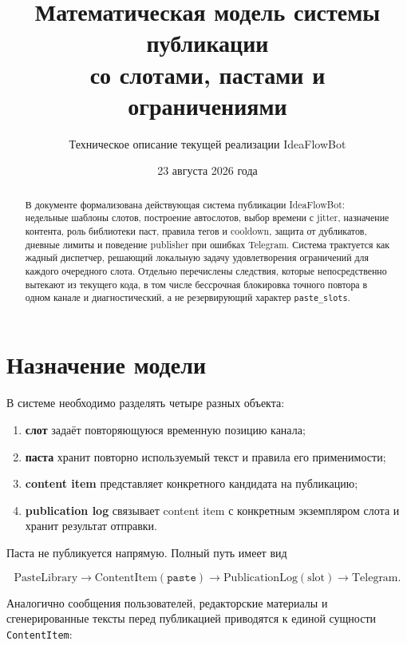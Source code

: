\documentclass[12pt,a4paper]{article}
\title{\textbf{Математическая модель системы публикации\\со слотами, пастами и ограничениями}}
\author{Техническое описание текущей реализации IdeaFlowBot}
\date{23 августа 2026 года}
\newcommand{\Field}[1]{\texttt{#1}}
\newcommand{\Source}[1]{\texttt{#1}}
\begin{document}
\maketitle

\begin{abstract}
В документе формализована действующая система публикации IdeaFlowBot: недельные
шаблоны слотов, построение автослотов, выбор времени с jitter, назначение
контента, роль библиотеки паст, правила тегов и cooldown, защита от дубликатов,
дневные лимиты и поведение publisher при ошибках Telegram. Система трактуется
как жадный диспетчер, решающий локальную задачу удовлетворения ограничений для
каждого очередного слота. Отдельно перечислены следствия, которые непосредственно
вытекают из текущего кода, в том числе бессрочная блокировка точного повтора в
одном канале и диагностический, а не резервирующий характер
\Field{paste\_slots}.
\end{abstract}

\tableofcontents
\newpage

\section{Назначение модели}

В системе необходимо разделять четыре разных объекта:

\begin{enumerate}
  \item \textbf{слот} задаёт повторяющуюся временную позицию канала;
  \item \textbf{паста} хранит повторно используемый текст и правила его применимости;
  \item \textbf{content item} представляет конкретного кандидата на публикацию;
  \item \textbf{publication log} связывает content item с конкретным экземпляром
        слота и хранит результат отправки.
\end{enumerate}

Паста не публикуется напрямую. Полный путь имеет вид

\begin{equation}
  \text{PasteLibrary}
  \longrightarrow
  \text{ContentItem}(\Source{paste})
  \longrightarrow
  \text{PublicationLog}(\text{slot})
  \longrightarrow
  \text{Telegram}.
  \label{eq:paste-pipeline}
\end{equation}

Аналогично сообщения пользователей, редакторские материалы и сгенерированные
тексты перед публикацией приводятся к единой сущности \texttt{ContentItem}:
\end{document}
